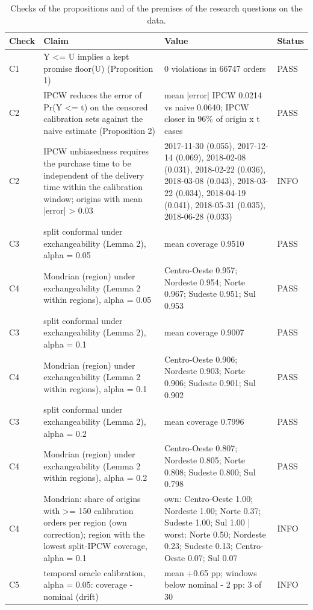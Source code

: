 \begin{table}[!htbp]
\centering
\footnotesize
\caption{Checks of the propositions and of the premises of the research questions on the data.}
\label{tab:theory}
\begin{tabular}{lp{5.5cm}p{6cm}l}
\toprule
Check & Claim & Value & Status \\
\midrule
C1 & Y <= U implies a kept promise floor(U) (Proposition 1) & 0 violations in 66747 orders & PASS \\
C2 & IPCW reduces the error of Pr(Y <= t) on the censored calibration sets against the naive estimate (Proposition 2) & mean |error| IPCW 0.0214 vs naive 0.0640; IPCW closer in 96\% of origin x t cases & PASS \\
C2 & IPCW unbiasedness requires the purchase time to be independent of the delivery time within the calibration window; origins with mean |error| > 0.03 & 2017-11-30 (0.055), 2017-12-14 (0.069), 2018-02-08 (0.031), 2018-02-22 (0.036), 2018-03-08 (0.043), 2018-03-22 (0.034), 2018-04-19 (0.041), 2018-05-31 (0.035), 2018-06-28 (0.033) & INFO \\
C3 & split conformal under exchangeability (Lemma 2), alpha = 0.05 & mean coverage 0.9510 & PASS \\
C4 & Mondrian (region) under exchangeability (Lemma 2 within regions), alpha = 0.05 & Centro-Oeste 0.957; Nordeste 0.954; Norte 0.967; Sudeste 0.951; Sul 0.953 & PASS \\
C3 & split conformal under exchangeability (Lemma 2), alpha = 0.1 & mean coverage 0.9007 & PASS \\
C4 & Mondrian (region) under exchangeability (Lemma 2 within regions), alpha = 0.1 & Centro-Oeste 0.906; Nordeste 0.903; Norte 0.906; Sudeste 0.901; Sul 0.902 & PASS \\
C3 & split conformal under exchangeability (Lemma 2), alpha = 0.2 & mean coverage 0.7996 & PASS \\
C4 & Mondrian (region) under exchangeability (Lemma 2 within regions), alpha = 0.2 & Centro-Oeste 0.807; Nordeste 0.805; Norte 0.808; Sudeste 0.800; Sul 0.798 & PASS \\
C4 & Mondrian: share of origins with >= 150 calibration orders per region (own correction); region with the lowest split-IPCW coverage, alpha = 0.1 & own: Centro-Oeste 1.00; Nordeste 1.00; Norte 0.37; Sudeste 1.00; Sul 1.00 | worst: Norte 0.50; Nordeste 0.23; Sudeste 0.13; Centro-Oeste 0.07; Sul 0.07 & INFO \\
C5 & temporal oracle calibration, alpha = 0.05: coverage - nominal (drift) & mean +0.65 pp; windows below nominal - 2 pp: 3 of 30 & INFO \\

\end{tabular}
\end{table}
